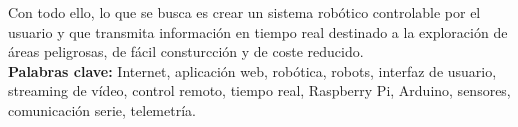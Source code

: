 Con todo ello, lo que se busca es crear un sistema robótico controlable por el usuario y que transmita información en tiempo real destinado a la exploración de áreas peligrosas, 
de fácil consturcción y de coste reducido.\\

\textbf{Palabras clave:} Internet, aplicación web, robótica, robots, interfaz de usuario, streaming de vídeo, control remoto, tiempo real, Raspberry Pi, Arduino, sensores, comunicación serie,
telemetría.\\
